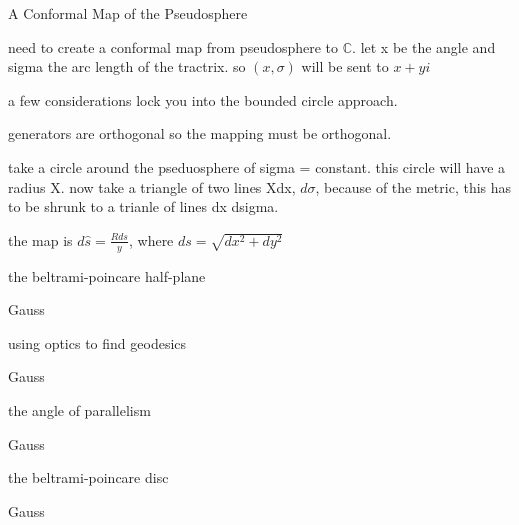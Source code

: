 \documentclass{article}
\newenvironment{andrew_section}[1]
    {
    \section{#1}
    \begin{itemize}
    }
    {
    \end{itemize}
    }
\begin{document}
\begin{andrew_section}{A Conformal Map of the Pseudosphere}
    \item 
        need to create a conformal map from pseudosphere to $\mathbb{C}$.
        let x be the angle and sigma the arc length of the tractrix.
        so $(x,\sigma)$ will be sent to $x + yi$
    \item 
        a few considerations lock you into the bounded circle approach.
    \item 
        generators are orthogonal so the mapping must be orthogonal.
    \item 
        take a circle around the pseduosphere of sigma = constant.  this
        circle will have a radius X.  now take a triangle of two lines Xdx,
        $d\sigma$, because of the metric, this has to be shrunk to a trianle of
        lines dx dsigma.
    \item 
        the map is $d\hat{s} = \frac{R ds}{y}$, where $ds = \sqrt{dx^2 + dy^2}$
\end{andrew_section}

\begin{andrew_section}{the beltrami-poincare half-plane}
    \item 
        Gauss
\end{andrew_section}

\begin{andrew_section}{using optics to find geodesics}
    \item 
        Gauss
\end{andrew_section}

\begin{andrew_section}{the angle of parallelism}
    \item 
        Gauss
\end{andrew_section}

\begin{andrew_section}{the beltrami-poincare disc}
    \item 
        Gauss
\end{andrew_section}
\end{document}
